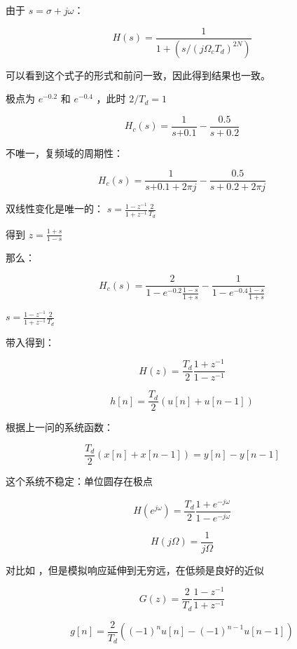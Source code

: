 \documentclass[lang=cn,11pt,a4paper,cite=authoryear,twocolumn]{elegantpaper}
\begin{document}

由于 \(s = \sigma + j \omega\)：

\[H(s) = \frac{1}{1 + (s / (j \Omega_c T_d)^{2N})}\] 

可以看到这个式子的形式和前问一致，因此得到结果也一致。



极点为 \(e^{-0.2}\) 和 \(e^{-0.4}\) ，此时 \(2/T_d = 1\) 

\[H_c(s) = \frac{1}{s{+0.1}} - \frac{0.5}{s+0.2}\]

不唯一，复频域的周期性：

\[H_c(s) = \frac{1}{s{+0.1+2\pi j}} - \frac{0.5}{s+0.2+2\pi j}\]



双线性变化是唯一的： \(s = \frac{1-z^{-1}}{1+z^{-1}} \frac{2}{T_d}\) 

得到 \(z = \frac{1+s}{1-s}\) 

那么：

\[H_c(s) =  \frac{2}{1-e^{-0.2}\frac{1-s}{1+s}} -  \frac{1}{1-e^{-0.4}\frac{1-s}{1+s}}\]





\(s = \frac{1-z^{-1}}{1+z^{-1}} \frac{2}{T_d}\) 

带入得到：

\[H(z) = \frac{T_d}{2} \frac{1 + z^{-1}}{1 - z^{-1}}\]

\[h[n] = \frac{T_d}{2} (u[n] + u[n-1]) \]


根据上一问的系统函数：

\[\frac{T_d}{2} (x[n] + x[n-1]) = y[n] - y[n-1]\]

这个系统不稳定：单位圆存在极点


\[H(e^{j\omega}) = \frac{T_d}{2} \frac{1 + e^{-j\omega}}{1 - e^{-j\omega}}\]

\[H(j\Omega) = \frac{1}{j \Omega}\]

对比如  ，但是模拟响应延伸到无穷远，在低频是良好的近似



\[G(z) = \frac{2}{T_d} \frac{1-z^{-1}}{1+z^{-1}}\]

\[g[n] = \frac{2}{T_d} ((-1)^n u[n] - (-1)^{n-1} u[n-1])\]
\end{document}
